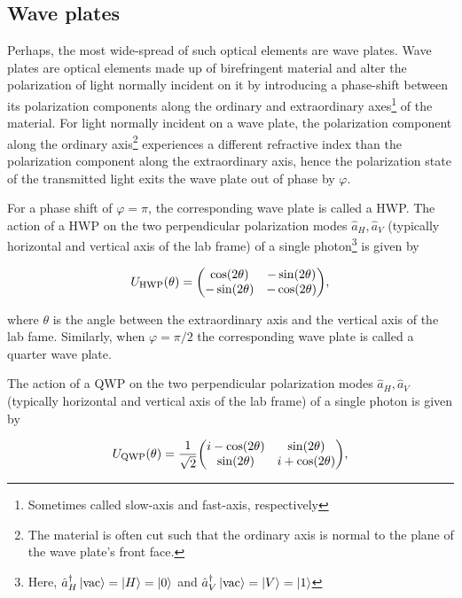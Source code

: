 \subsection{Wave plates}
Perhaps, the most wide-spread of such optical elements are wave plates. Wave plates are optical elements made up of birefringent material and alter the polarization of light normally incident on it by introducing a phase-shift between its polarization components along the ordinary and extraordinary axes\footnote{Sometimes called slow-axis and fast-axis, respectively} of the material. For light normally incident on a wave plate, the polarization component along the ordinary axis\footnote{The material is often cut such that the ordinary axis is normal to the plane of the wave plate's front face.} experiences a different refractive index than the polarization component along the extraordinary axis, hence the polarization state of the transmitted light exits the wave plate out of phase by $\varphi$.  

\bigskip
\noindent
For a phase shift of $\varphi=\pi$, the corresponding wave plate is called a \gls{HWP}. The action of a \acs{HWP} on the two perpendicular polarization modes $\hat{a}_H, \hat{a}_{V}$ (typically horizontal and vertical axis of the lab frame) of a single photon\footnote{Here, $\hat{a}^{\dagger}_H\ket{\text{vac}} = \ket{H} = \ket{0}$ and $\hat{a}^{\dagger}_V\ket{\text{vac}}=\ket{V}=\ket{1}$} is given by~\cite{Kok_2007}

\begin{align}
	U_\text{HWP}(\theta) = \mqty(\cos(2\theta) & -\sin (2\theta) \\
			-\sin (2 \theta ) & -\cos (2 \theta )),
\end{align}

\noindent
where $\theta$ is the angle between the extraordinary axis and the vertical axis of the lab fame. Similarly, when $\varphi=\pi/2$ the corresponding wave plate is called a quarter wave plate. 

\clearpage
\noindent
The action of a \acs{QWP} on the two perpendicular polarization modes $\hat{a}_H, \hat{a}_{V}$ (typically horizontal and vertical axis of the lab frame) of a single photon is given by~\cite{Kok_2007}

\begin{align}
 U_\text{QWP}(\theta) = \frac{1}{\sqrt{2}}\mqty(i-\cos (2 \theta ) & \sin (2 \theta ) \\
 \sin (2 \theta ) & i + \cos (2 \theta )),
\end{align}

